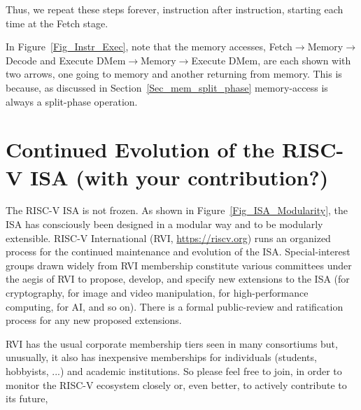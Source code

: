 Thus, we repeat these steps forever, instruction after instruction,
starting each time at the Fetch stage.

In Figure~\ref{Fig_Instr_Exec}, note that the memory accesses,
Fetch$\longrightarrow$Memory$\longrightarrow$Decode and Execute
DMem$\longrightarrow$Memory$\longrightarrow$Execute DMem, are each
shown with two arrows, one going to memory and another returning from
memory.  This is because, as discussed in
Section~\ref{Sec_mem_split_phase} memory-access is always a
split-phase operation.


\section{Continued Evolution of the RISC-V ISA (with your contribution?)}


The RISC-V ISA is not frozen.  As shown in
Figure~\ref{Fig_ISA_Modularity}, the ISA has consciously been designed
in a modular way and to be modularly extensible.  RISC-V International
(RVI, \url{https://riscv.org}) runs an organized process for the
continued maintenance and evolution of the ISA.  Special-interest
groups drawn widely from RVI membership constitute various committees
under the aegis of RVI to propose, develop, and specify new extensions
to the ISA (for cryptography, for image and video manipulation, for
high-performance computing, for AI, and so on).  There is a formal
public-review and ratification process for any new proposed
extensions.

RVI has the usual corporate membership tiers seen in many consortiums
but, unusually, it also has inexpensive memberships for individuals
(students, hobbyists, ...)  and academic institutions.  So please feel
free to join, in order to monitor the RISC-V ecosystem closely or,
even better, to actively contribute to its future,

